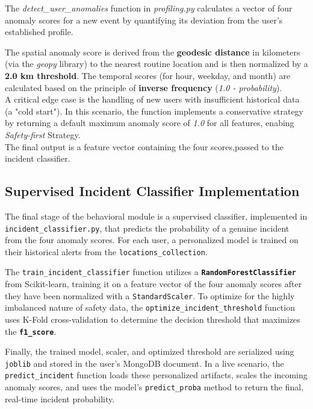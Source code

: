 \documentclass[12pt,a4paper,oneside,english]{book}
\begin{document}
{The \textit{detect\_user\_anomalies} function in \textit{profiling.py} calculates a vector of four anomaly scores for a new event by quantifying its deviation from the user's established profile.

The spatial anomaly score is derived from the \textbf{geodesic distance} in kilometers (via the \textit{geopy} library) to the nearest routine location and is then normalized by a \textbf{2.0 km threshold}. The temporal scores (for hour, weekday, and month) are calculated based on the principle of \textbf{inverse frequency} (\textit{1.0 - probability}).
\\A critical edge case is the handling of new users with insufficient historical data (a "cold start"). In this scenario, the function implements a conservative strategy by returning a default maximum anomaly score of \textit{1.0} for all features, enabing \textit{Safety-first} Strategy.
\\The final output is a feature vector containing the four scores,passed to the incident classifier.
\subsection{Supervised Incident Classifier Implementation}
\label{sec:Incident_class_impl}

The final stage of the behavioral module is a supervised classifier, implemented in \texttt{incident\_classifier.py}, that predicts the probability of a genuine incident from the four anomaly scores. For each user, a personalized model is trained on their historical alerts from the \texttt{locations\_collection}.

The \texttt{train\_incident\_classifier} function utilizes a \textbf{\texttt{RandomForestClassifier}} from Scikit-learn, training it on a feature vector of the four anomaly scores after they have been normalized with a \texttt{StandardScaler}. To optimize for the highly imbalanced nature of safety data, the \texttt{optimize\_incident\_threshold} function uses K-Fold cross-validation to determine the decision threshold that maximizes the \textbf{\texttt{f1\_score}}.

Finally, the trained model, scaler, and optimized threshold are serialized using \texttt{joblib} and stored in the user's MongoDB document. In a live scenario, the \texttt{predict\_incident} function loads these personalized artifacts, scales the incoming anomaly scores, and uses the model's \texttt{predict\_proba} method to return the final, real-time incident probability.


}
\end{document}
